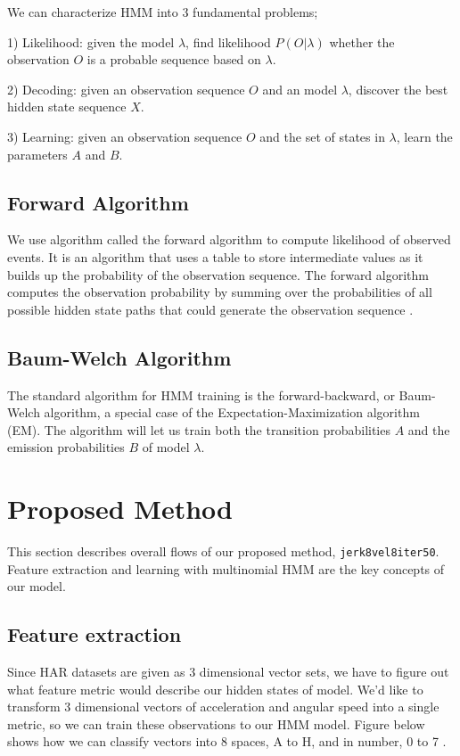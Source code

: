 \documentclass[10pt,twocolumn,letterpaper]{article}
\begin{document}
We can characterize HMM into 3 fundamental problems;

1) Likelihood: given the model $\lambda$, find likelihood $P(O|\lambda)$ whether the observation $O$ is a probable sequence based on $\lambda$.

2) Decoding: given an observation sequence $O$ and an model $\lambda$, discover the best hidden state sequence $X$.

3) Learning: given an observation sequence $O$ and the set of states in $\lambda$, learn the parameters $A$ and $B$.

\subsection{Forward Algorithm}


We use algorithm called the forward algorithm to compute likelihood of observed events. It is an algorithm that uses a table to store intermediate values as it builds up the probability of the observation sequence. The forward algorithm computes the observation probability by summing over the probabilities of all possible hidden state paths that could generate the observation sequence \cite{hmm}.

\subsection{Baum-Welch Algorithm}
The standard algorithm for HMM training is the forward-backward, or Baum-Welch algorithm, a special case of the Expectation-Maximization algorithm (EM). The algorithm will let us train both the transition probabilities $A$ and the emission probabilities $B$ of model $\lambda$.

\section{Proposed Method}
This section describes overall flows of our proposed method, \texttt{jerk8vel8iter50}. Feature extraction and learning with multinomial HMM are the key concepts of our model.

\subsection{Feature extraction}
Since HAR datasets are given as 3 dimensional vector sets, we have to figure out what feature metric would describe our hidden states of model. We'd like to transform 3 dimensional vectors of acceleration and angular speed into a single metric, so we can train these observations to our HMM model. Figure below shows how we can classify vectors into 8 spaces, A to H, and in number, 0 to 7 \wrt.
\end{document}
